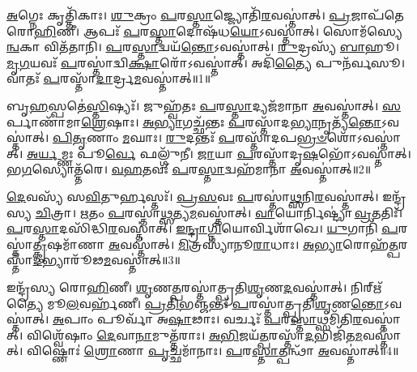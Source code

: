\setcounter{anuvakam}{0}

\-\ul{𑌅}\-𑌗𑍍𑌨𑍇𑌃 𑌕𑍃𑌤𑍍𑌤𑌿᳴𑌕𑌾𑌃।
\-\ul{𑌶𑍁}\-𑌕𑍍𑌰𑌂 \ul{𑌪}\-𑌰\-\ul{𑌸𑍍𑌤𑌾}\-𑌜𑍍𑌜𑍍𑌯𑍋𑌤𑌿᳴\-\ul{𑌰}\-𑌵𑌸𑍍𑌤𑌾॑𑌤𑍍।
\-\ul{𑌪𑍍𑌰}\-𑌜𑌾𑌪᳴𑌤𑍇 𑌰𑍋\-\ul{𑌹𑌿}\-𑌣𑍀।
𑌆𑌪𑌃᳴ \ul{𑌪}\-𑌰\-\ul{𑌸𑍍𑌤𑌾}\-𑌦𑍋𑌷᳴𑌧\-\ul{𑌯𑍋}\-\-𑌽𑌵𑌸𑍍𑌤𑌾॑𑌤𑍍।
𑌸𑍋𑌮᳴𑌸𑍍𑌯𑍇\-\ul{𑌨𑍍𑌵}\-𑌕𑌾 𑌵𑌿𑌤᳴𑌤𑌾𑌨𑌿।
\-\ul{𑌪}\-𑌰\-\ul{𑌸𑍍𑌤𑌾}\-𑌦𑍍𑌵𑌯᳴\-\ul{𑌨𑍍𑌤𑍋}\-\-𑌽𑌵𑌸𑍍𑌤𑌾॑𑌤𑍍।
\-\ul{𑌰𑍁}\-𑌦𑍍𑌰𑌸𑍍𑌯᳴ \ul{𑌬𑌾}\-𑌹𑍂।
\-\ul{𑌮𑍃}\-\-\ul{𑌗}\-𑌯𑌵𑌃᳴ \ul{𑌪}\-𑌰𑌸𑍍𑌤𑌾॑𑌦𑍍𑌵𑌿\-\ul{𑌕𑍍𑌷𑌾}\-𑌰𑍋᳴\-𑌽𑌵𑌸𑍍𑌤𑌾॑𑌤𑍍।
𑌅𑌦𑌿᳴\-\ul{𑌤𑍍𑌯𑍈} 𑌪𑍁𑌨᳴𑌰𑍍𑌵𑌸𑍂।
𑌵𑌾𑌤𑌃᳴ \ul{𑌪}\-𑌰𑌸𑍍𑌤𑌾᳴\-\ul{𑌦𑌾}\-𑌰𑍍𑌦𑍍𑌰\-\ul{𑌮}\-𑌵𑌸𑍍𑌤𑌾॑𑌤𑍍॥1॥

𑌬𑍃\-\ul{𑌹}\-𑌸𑍍𑌪𑌤𑍇॑\-\ul{𑌸𑍍𑌤𑌿}\-𑌷𑍍𑌯𑌃᳴।
𑌜𑍁𑌹𑍍𑌵᳴𑌤𑌃 \ul{𑌪}\-𑌰\-\ul{𑌸𑍍𑌤𑌾}\-𑌦𑍍𑌯𑌜᳴𑌮𑌾𑌨𑌾 \ul{𑌅}\-𑌵𑌸𑍍𑌤𑌾॑𑌤𑍍।
\-\ul{𑌸}\-𑌰𑍍𑌪𑌾𑌣𑌾᳴𑌮𑌾\-\ul{𑌶𑍍𑌰𑍇}\-𑌷𑌾𑌃।
\-\ul{𑌅}\-\-\ul{𑌭𑍍𑌯𑌾}\-𑌗𑌚𑍍𑌛᳴𑌨𑍍𑌤𑌃 \ul{𑌪}\-𑌰𑌸𑍍𑌤𑌾᳴𑌦\-\ul{𑌭𑍍𑌯𑌾}\-𑌨𑍃𑌤𑍍𑌯᳴\-\ul{𑌨𑍍𑌤𑍋}\-\-𑌽𑌵𑌸𑍍𑌤𑌾॑𑌤𑍍।
\-\ul{𑌪𑌿}\-\-\ul{𑌤𑍃}\-𑌣𑌾𑌂 \ul{𑌮}\-𑌘𑌾𑌃।
\-\ul{𑌰𑍁}\-𑌦𑌨𑍍𑌤𑌃᳴ \ul{𑌪}\-𑌰𑌸𑍍𑌤𑌾᳴𑌦𑌪\-\ul{𑌭𑍍𑌰}\-\-\ul{𑍞}\-𑌶𑍋᳴\-𑌽𑌵𑌸𑍍𑌤𑌾॑𑌤𑍍।
\-\ul{𑌅}\-\-\ul{𑌰𑍍𑌯}\-𑌮𑍍𑌣𑌃 𑌪𑍂\-\ul{𑌰𑍍𑌵𑍇} 𑌫𑌲𑍍𑌗𑍁᳴𑌨𑍀।
\-\ul{𑌜𑌾}\-𑌯𑌾 \ul{𑌪}\-𑌰𑌸𑍍𑌤𑌾᳴𑌦𑍃\-\ul{𑌷}\-𑌭𑍋᳴\-𑌽𑌵𑌸𑍍𑌤𑌾॑𑌤𑍍।
𑌭\-\ul{𑌗}\-𑌸𑍍𑌯𑍋𑌤𑍍𑌤᳴𑌰𑍇।
\-\ul{𑌵}\-\-\ul{𑌹}\-𑌤𑌵𑌃᳴ \ul{𑌪}\-𑌰\-\ul{𑌸𑍍𑌤𑌾}\-𑌦𑍍𑌵𑌹᳴𑌮𑌾𑌨𑌾 \ul{𑌅}\-𑌵𑌸𑍍𑌤𑌾॑𑌤𑍍॥2॥

\-\ul{𑌦𑍇}\-𑌵𑌸𑍍𑌯᳴ 𑌸\-\ul{𑌵𑌿}\-𑌤𑍁𑌰𑍍\mbox{}𑌹𑌸𑍍𑌤𑌃᳴।
\-\ul{𑌪𑍍𑌰}\-\-\ul{𑌸}\-𑌵𑌃 \ul{𑌪}\-𑌰𑌸𑍍𑌤𑌾॑\-\ul{𑌥𑍍𑌸}\-𑌨𑌿\-\ul{𑌰}\-𑌵𑌸𑍍𑌤𑌾॑𑌤𑍍।
𑌇𑌨𑍍𑌦𑍍𑌰᳴𑌸𑍍𑌯 \ul{𑌚𑌿}\-𑌤𑍍𑌰𑌾।
\-\ul{𑌋}\-𑌤𑌂 \ul{𑌪}\-𑌰𑌸𑍍𑌤𑌾॑\-\ul{𑌥𑍍𑌸}\-𑌤𑍍𑌯\-\ul{𑌮}\-𑌵𑌸𑍍𑌤𑌾॑𑌤𑍍।
\-\ul{𑌵𑌾}\-𑌯𑍋𑌰𑍍𑌨𑌿𑌷𑍍𑌟𑍍𑌯𑌾॑ \ul{𑌵𑍍𑌰}\-𑌤𑌤𑌿𑌃᳴।
\-\ul{𑌪}\-𑌰\-\ul{𑌸𑍍𑌤𑌾}\-𑌦𑌸𑌿᳴𑌦𑍍𑌧𑌿\-\ul{𑌰}\-𑌵𑌸𑍍𑌤𑌾॑𑌤𑍍।
\-\ul{𑌇}\-\-\ul{𑌨𑍍𑌦𑍍𑌰𑌾}\-\-\ul{𑌗𑍍𑌨𑌿}\-𑌯𑍋𑌰𑍍𑌵𑌿𑌶𑌾᳴𑌖𑍇।
\-\ul{𑌯𑍁}\-𑌗𑌾𑌨𑌿᳴ \ul{𑌪}\-𑌰𑌸𑍍𑌤𑌾॑\-\ul{𑌤𑍍𑌕𑍃}\-𑌷𑌮𑌾᳴𑌣𑌾 \ul{𑌅}\-𑌵𑌸𑍍𑌤𑌾॑𑌤𑍍।
\-\ul{𑌮𑌿}\-𑌤𑍍𑌰𑌸𑍍𑌯𑌾᳴𑌨𑍂\-\ul{𑌰𑌾}\-𑌧𑌾𑌃।
\-\ul{𑌅}\-\-\ul{𑌭𑍍𑌯𑌾}\-𑌰𑍋𑌹᳴\-\ul{𑌤𑍍𑌪}\-𑌰𑌸𑍍𑌤𑌾᳴\-\-\ul{𑌦}\-𑌭𑍍𑌯𑌾𑌰𑍂᳴𑌢\-\ul{𑌮}\-𑌵𑌸𑍍𑌤𑌾॑𑌤𑍍॥3॥

𑌇𑌨𑍍𑌦𑍍𑌰᳴𑌸𑍍𑌯 𑌰𑍋\-\ul{𑌹𑌿}\-𑌣𑍀।
\-\ul{𑌶𑍃}\-𑌣\-\ul{𑌤𑍍𑌪}\-𑌰𑌸𑍍𑌤𑌾॑𑌤𑍍𑌪𑍍𑌰𑌤𑌿\-\ul{𑌶𑍃}\-𑌣\-\ul{𑌦}\-𑌵𑌸𑍍𑌤𑌾॑𑌤𑍍।
𑌨𑌿𑌰𑍍\mbox{}𑌋᳴𑌤𑍍𑌯𑍈 𑌮𑍂\-\ul{𑌲}\-𑌵𑌰𑍍\mbox{}𑌹᳴𑌣𑍀।
\-\ul{𑌪𑍍𑌰}\-\-\ul{𑌤𑌿}\-\-\ul{𑌭}\-𑌞𑍍𑌜𑌨𑍍𑌤𑌃᳴ \ul{𑌪}\-𑌰𑌸𑍍𑌤𑌾॑𑌤𑍍𑌪𑍍𑌰𑌤𑌿\-\ul{𑌶𑍃}\-𑌣\-\ul{𑌨𑍍𑌤𑍋}\-\-𑌽𑌵𑌸𑍍𑌤𑌾॑𑌤𑍍।
\-\ul{𑌅}\-𑌪𑌾𑌂 𑌪𑍂𑌰𑍍𑌵𑌾᳴ 𑌅\-\ul{𑌷𑌾}\-𑌢𑌾𑌃।
𑌵𑌰𑍍𑌚𑌃᳴ \ul{𑌪}\-𑌰\-\ul{𑌸𑍍𑌤𑌾}\-𑌥𑍍𑌸𑌮𑌿᳴𑌤𑌿\-\ul{𑌰}\-𑌵𑌸𑍍𑌤𑌾॑𑌤𑍍।
𑌵𑌿𑌶𑍍𑌵𑍇᳴𑌷𑌾𑌂 \ul{𑌦𑍇}\-𑌵𑌾\-\ul{𑌨𑌾}\-𑌮𑍁𑌤𑍍𑌤᳴𑌰𑌾𑌃।
\-\ul{𑌅}\-\-\ul{𑌭𑌿}\-𑌜𑌯᳴\-\ul{𑌤𑍍𑌪}\-𑌰𑌸𑍍𑌤𑌾᳴\-\ul{𑌦}\-𑌭𑌿𑌜𑌿᳴𑌤\-\ul{𑌮}\-𑌵𑌸𑍍𑌤𑌾॑𑌤𑍍।
𑌵𑌿𑌷𑍍𑌣𑍋𑌃॑ \ul{𑌶𑍍𑌰𑍋}\-𑌣𑌾 \ul{𑌪𑍃}\-𑌚𑍍𑌛𑌮𑌾᳴𑌨𑌾𑌃।
\-\ul{𑌪}\-𑌰\-\ul{𑌸𑍍𑌤𑌾}\-𑌤𑍍𑌪𑌨𑍍𑌥𑌾᳴ \ul{𑌅}\-𑌵𑌸𑍍𑌤𑌾॑𑌤𑍍॥4॥

